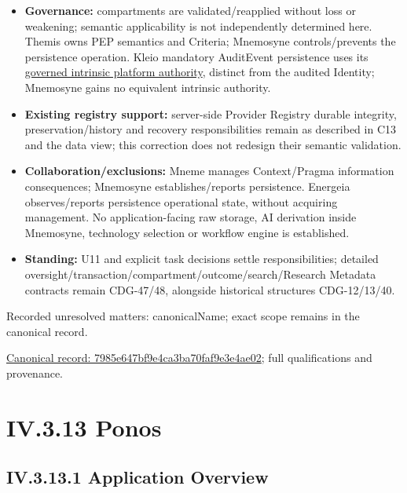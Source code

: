 \begin{itemize}
\item \textbf{Governance:} compartments are validated/reapplied without loss or weakening;
  semantic applicability is not independently determined here. Themis owns PEP
  semantics and Criteria; Mnemosyne controls/prevents the persistence operation.
  Kleio mandatory AuditEvent persistence uses its
  \href{\detokenize{../../../../../../../../../docs/markdown/05-information-systems-architecture/component-register.md#kleio-capture-authority}}{governed intrinsic platform authority}, distinct
  from the audited Identity; Mnemosyne gains no equivalent intrinsic authority.

\item \textbf{Existing registry support:} server-side Provider Registry durable integrity,
  preservation/history and recovery responsibilities remain as described in C13
  and the data view; this correction does not redesign their semantic validation.

\item \textbf{Collaboration/exclusions:} Mneme manages Context/Pragma information consequences;
  Mnemosyne establishes/reports persistence. Energeia observes/reports persistence
  operational state, without acquiring management. No application-facing raw storage,
  AI derivation inside Mnemosyne, technology selection or workflow engine is established.

\item \textbf{Standing:} U11 and explicit task decisions settle responsibilities; detailed
  oversight/transaction/compartment/outcome/search/Research Metadata contracts remain
  CDG-47/48, alongside historical structures CDG-12/13/40.

\end{itemize}

{\small Recorded unresolved matters: canonicalName; exact scope remains in the canonical record.}\par
{\footnotesize \href{../../../../../../../../continuum/application/application-component/7985e647bf9e4ca3ba70faf9e3e4ae02.md}{Canonical record: 7985e647bf9e4ca3ba70faf9e3e4ae02}; full qualifications and provenance.}\par
\section*{IV.3.13 Ponos}
\label{navigation:IV.3.13}

\subsection*{IV.3.13.1 Application Overview}
\label{navigation:IV.3.13.1}

